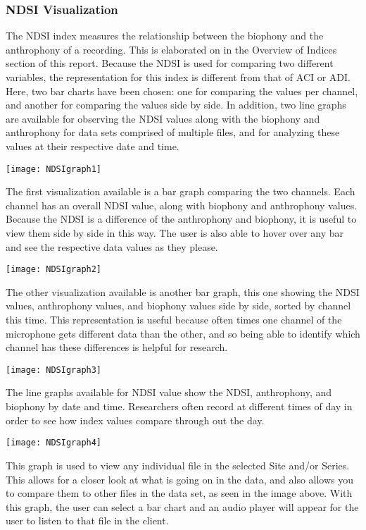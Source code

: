 \subsubsection{NDSI Visualization}
The NDSI index measures the relationship between the biophony and the anthrophony of a recording. This is elaborated on in the Overview of Indices section of this report. Because the NDSI is used for comparing two different variables, the representation for this index is different from that of ACI or ADI. Here, two bar charts have been chosen: one for comparing the values per channel, and another for comparing the values side by side. In addition, two line graphs are available for observing the NDSI values along with the biophony and anthrophony for data sets comprised of multiple files, and for analyzing these values at their respective date and time.\par

\begin{center}
  \texttt{[image: NDSIgraph1]} \\[12pt]
\end{center}
The first visualization available is a bar graph comparing the two channels. Each channel has an overall NDSI value, along with biophony and anthrophony values. Because the NDSI is a difference of the anthrophony and biophony, it is useful to view them side by side in this way. The user is also able to hover over any bar and see the respective data values as they please.\par

\begin{center}
  \texttt{[image: NDSIgraph2]} \\[12pt]
\end{center}
The other visualization available is another bar graph, this one showing the NDSI values, anthrophony values, and biophony values side by side, sorted by channel this time. This representation is useful because often times one channel of the microphone gets different data than the other, and so being able to identify which channel has these differences is helpful for research.\par

\begin{center}
  \texttt{[image: NDSIgraph3]} \\[12pt]
\end{center}
The line graphs available for NDSI value show the NDSI, anthrophony, and biophony by date and time. Researchers often record at different times of day in order to see how index values compare through out the day.\par

\begin{center}
  \texttt{[image: NDSIgraph4]} \\[12pt]
\end{center}
This graph is used to view any individual file in the selected Site and/or Series. This allows for a closer look at what is going on in the data, and also allows you to compare them to other files in the data set, as seen in the image above. With this graph, the user can select a bar chart and an audio player will appear for the user to listen to that file in the client.

